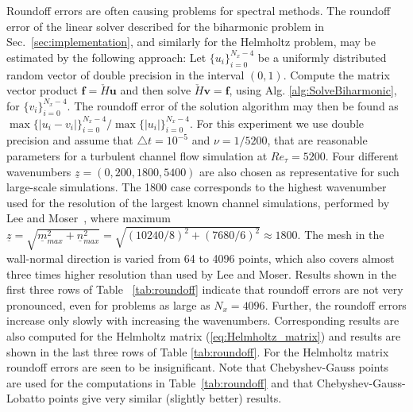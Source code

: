 \documentclass[preprint]{elsarticle}
\newcommand{\N}[1]{\check{#1}}
\begin{document}
Roundoff errors are often causing problems for spectral methods. The roundoff error of the linear solver described for the biharmonic problem in Sec.~\ref{sec:implementation}, and similarly for the Helmholtz problem, may be estimated 
by the following approach: Let $\{u_i\}_{i=0}^{N_x-4}$ be a uniformly distributed 
random vector of double precision in the interval $(0, 1)$. Compute the matrix vector product $\bm{f}=\N{H}\bm{u}$ and 
then solve $\N{H} \bm{v} = \bm{f}$, using Alg. \ref{alg:SolveBiharmonic}, for 
$\{v_i\}_{i=0}^{N_x-4}$. The roundoff error of the solution 
algorithm may then be found as $\max \{|u_i-v_i|\}_{i=0}^{N_x-4} / \max \{|u_i|\}_{i=0}^{N_x-4}$. For this experiment we use double precision and assume that $\triangle t= 10^{-5}$ 
and $\nu=1/5200$, that are reasonable parameters for a turbulent channel flow 
simulation at ${Re}_{\tau}=5200$. Four different wavenumbers 
$\underline{z}=(0, 200, 1800, 5400)$ are 
also chosen as representative for such large-scale simulations. The 1800 case corresponds to the highest wavenumber used for the resolution 
of the largest known channel simulations, performed by Lee and 
Moser~\cite{leemoser15}, where maximum $\underline{z} = \sqrt{\underline{m}_{max}^2+\underline{n}_{max}^2} = \sqrt{(10240/8)^2 + (7680/6)^2} \approx 1800$. The mesh in the wall-normal direction 
is varied from 64 to 4096 points, which also covers almost three times higher 
resolution than used by Lee and Moser. Results shown in the 
first three rows of Table ~\ref{tab:roundoff} indicate that 
roundoff errors are not very pronounced, even for problems as large as 
$N_x=4096$. Further, the roundoff errors increase only slowly with increasing 
the wavenumbers. Corresponding results are also computed for the Helmholtz 
matrix (\ref{eq:Helmholtz_matrix}) and 
results are shown in the last three rows of Table \ref{tab:roundoff}. For 
the Helmholtz matrix roundoff errors are seen to be insignificant. Note that Chebyshev-Gauss points are used for the computations in Table~\ref{tab:roundoff} and that Chebyshev-Gauss-Lobatto points give very similar (slightly better) results.
\end{document}
